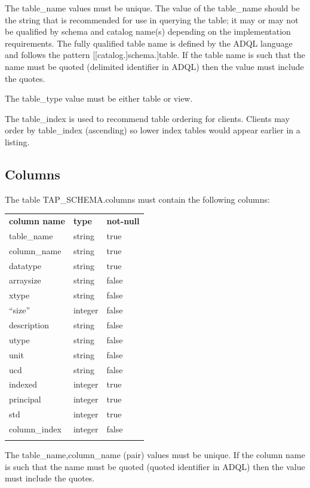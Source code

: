 \documentclass[11pt,letter]{ivoa}
\newcommand{\tapschema}{TAP\_SCHEMA}
\newcommand{\tapschema}{{%
  \relsize{-0.5}TAP\discretionary{-}{}{\kern-2pt\_}SCHEMA}}
\begin{document}
The table\_name values must be unique. The value of the 
table\_name should be the string that is recommended for use in 
querying the table; it may or may not be qualified by schema and catalog name(s) 
depending on the implementation requirements. The fully qualified table name is 
defined by the ADQL language and follows the pattern [[catalog.]schema.]table. 
If the table name is such that the name must be quoted (delimited identifier in 
ADQL) then the value must include the quotes.

The table\_type value must be either table or view.

The table\_index is used to recommend table ordering for clients. Clients 
may order by table\_index (ascending) so lower index tables would appear 
earlier in a listing.

\subsection{Columns}
\label{sec:tap-schema-columns}
The table \tapschema.columns must contain the following columns:

\begin{inlinetable}
\begin{tabular}{l l l}
\sptablerule
\textbf{column name} & \textbf{type} & \textbf{not-null} \\
\sptablerule
table\_name & string & true \\
column\_name & string & true \\
datatype & string & true \\
arraysize & string & false \\
xtype & string & false \\
``size'' & integer & false \\
description & string & false \\
utype & string & false \\
unit & string & false \\
ucd & string & false \\
indexed & integer & true \\
principal & integer & true \\
std & integer & true \\
column\_index & integer & false \\
\sptablerule
\end{tabular}
\end{inlinetable}

The table\_name,column\_name (pair) values must be unique. If the column name is such that 
the name must be quoted (quoted identifier in ADQL) then the value must include the quotes.
\end{document}

